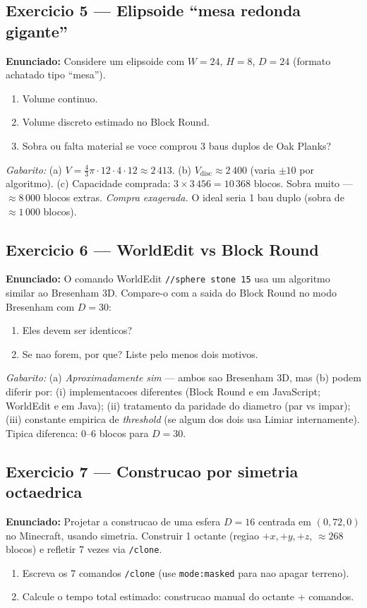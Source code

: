 \documentclass[12pt,a4paper]{scrartcl}
\newcommand{\cmd}[1]{\textcolor{earth}{\texttt{\small #1}}}
\begin{document}
\subsection*{Exercicio 5 --- Elipsoide \enquote{mesa redonda gigante}}
\textbf{Enunciado:} Considere um elipsoide com $W = 24$, $H = 8$, $D = 24$ (formato achatado tipo \enquote{mesa}).
\begin{enumerate}[label=\alph*),leftmargin=1.5em,itemsep=0.1em,topsep=0.2em,nosep]
  \item Volume continuo.
  \item Volume discreto estimado no Block Round.
  \item Sobra ou falta material se voce comprou 3 baus duplos de Oak Planks?
\end{enumerate}

\emph{Gabarito:}
(a) $V = \tfrac{4}{3}\pi \cdot 12 \cdot 4 \cdot 12 \approx 2\,413$.
(b) $V_{\mathrm{disc}} \approx 2\,400$ (varia $\pm 10$ por algoritmo).
(c) Capacidade comprada: $3 \times 3\,456 = 10\,368$ blocos. Sobra muito --- $\approx 8\,000$ blocos extras. \emph{Compra exagerada.} O ideal seria 1 bau duplo (sobra de $\approx 1\,000$ blocos).

\subsection*{Exercicio 6 --- WorldEdit vs Block Round}
\textbf{Enunciado:} O comando WorldEdit \cmd{//sphere stone 15} usa um algoritmo similar ao Bresenham 3D. Compare-o com a saida do Block Round no modo Bresenham com $D = 30$:
\begin{enumerate}[label=\alph*),leftmargin=1.5em,itemsep=0.1em,topsep=0.2em,nosep]
  \item Eles devem ser identicos?
  \item Se nao forem, por que? Liste pelo menos dois motivos.
\end{enumerate}

\emph{Gabarito:}
(a) \emph{Aproximadamente sim} --- ambos sao Bresenham 3D, mas (b) podem diferir por: (i) implementacoes diferentes (Block Round e em JavaScript; WorldEdit e em Java); (ii) tratamento da paridade do diametro (par vs impar); (iii) constante empirica de \emph{threshold} (se algum dos dois usa Limiar internamente). Tipica diferenca: 0--6 blocos para $D = 30$.

\subsection*{Exercicio 7 --- Construcao por simetria octaedrica}
\textbf{Enunciado:} Projetar a construcao de uma esfera $D = 16$ centrada em $(0, 72, 0)$ no Minecraft, usando simetria. Construir 1 octante (regiao $+x, +y, +z$, $\approx 268$ blocos) e refletir 7 vezes via \cmd{/clone}.
\begin{enumerate}[label=\alph*),leftmargin=1.5em,itemsep=0.1em,topsep=0.2em,nosep]
  \item Escreva os 7 comandos \cmd{/clone} (use \cmd{mode:masked} para nao apagar terreno).
  \item Calcule o tempo total estimado: construcao manual do octante + comandos.
\end{enumerate}
\end{document}
